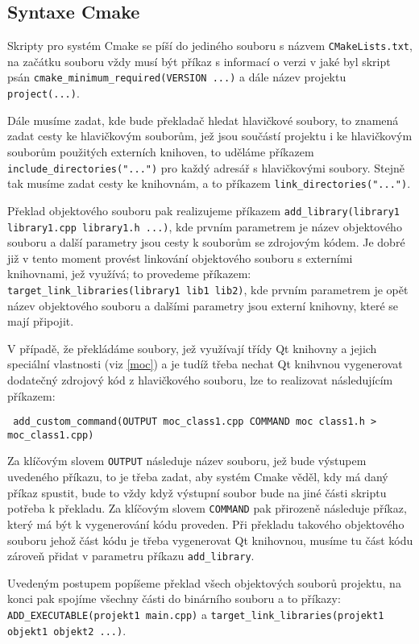 \subsection{Syntaxe Cmake}
Skripty pro systém Cmake se píší do jediného souboru s názvem \texttt{CMake\-Lists.txt}, na začátku souboru vždy musí být příkaz s informací o verzi v jaké byl skript psán \texttt{cmake\-\_minimum\-\_required\-(VERSION ...)} a dále název projektu \texttt{project\-(...)}.

Dále musíme zadat, kde bude překladač hledat hlavičkové soubory, to znamená zadat cesty ke hlavičkovým souborům, jež jsou součástí projektu i ke hlavičkovým souborům použitých externích knihoven, to uděláme příkazem \texttt{include\-\_directories\-("...")} pro každý adresář s hlavičkovými soubory. Stejně tak musíme zadat cesty ke knihovnám, a to příkazem \texttt{link\-\_directories\-("...")}.

Překlad objektového souboru pak realizujeme příkazem \texttt{add\-\_library\-(library1 library1.cpp library1.h ...)}, kde prvním parametrem je název objektového souboru a další parametry jsou cesty k souborům se zdrojovým kódem. Je dobré již v tento moment provést linkování objektového souboru s externími knihovnami, jež využívá; to provedeme příkazem: \texttt{target\-\_link\-\_libraries\-(library1 lib1 lib2)}, kde prvním parametrem je opět název objektového souboru a dalšími parametry jsou externí knihovny, které se mají připojit.

V případě, že překládáme soubory, jež využívají třídy Qt knihovny a jejich speciální vlastnosti (viz \ref{moc}) a je tudíž třeba nechat Qt knihvnou vygenerovat dodatečný zdrojový kód z hlavičkového souboru, lze to realizovat následujícím příkazem:

\noindent
{\tt
add\-\_custom\-\_command\-(OUTPUT moc\-\_class1.cpp COMMAND moc class1.h > \\
moc\_class1\-.cpp)
}

Za klíčovým slovem \texttt{OUTPUT} následuje název souboru, jež bude výstupem uvedeného příkazu, to je třeba zadat, aby systém Cmake věděl, kdy má daný příkaz spustit, bude to vždy když výstupní soubor bude na jiné části skriptu potřeba k překladu. Za klíčovým slovem \texttt{COMMAND} pak přirozeně následuje příkaz, který má být k vygenerování kódu proveden. Při překladu takového objektového souboru jehož část kódu je třeba vygenerovat Qt knihovnou, musíme tu část kódu zároveň přidat v parametru příkazu \texttt{add\-\_library}.

Uvedeným postupem popíšeme překlad všech objektových souborů projektu, na konci pak spojíme všechny části do binárního souboru a to příkazy: \texttt{ADD\-\_EXECUTABLE\-(projekt1 main.cpp)} a \texttt{target\-\_link\-\_libraries\-(projekt1 objekt1 objekt2 ...)}.

